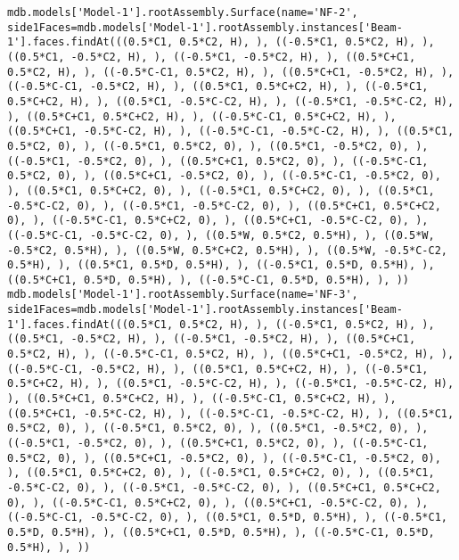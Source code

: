 \documentclass[12pt, letterpaper, oneside]{report}
\begin{document}
\begin{lstlisting}[frame=none]
mdb.models['Model-1'].rootAssembly.Surface(name='NF-2', side1Faces=mdb.models['Model-1'].rootAssembly.instances['Beam-1'].faces.findAt(((0.5*C1, 0.5*C2, H), ), ((-0.5*C1, 0.5*C2, H), ), ((0.5*C1, -0.5*C2, H), ), ((-0.5*C1, -0.5*C2, H), ), ((0.5*C+C1, 0.5*C2, H), ), ((-0.5*C-C1, 0.5*C2, H), ), ((0.5*C+C1, -0.5*C2, H), ), ((-0.5*C-C1, -0.5*C2, H), ), ((0.5*C1, 0.5*C+C2, H), ), ((-0.5*C1, 0.5*C+C2, H), ), ((0.5*C1, -0.5*C-C2, H), ), ((-0.5*C1, -0.5*C-C2, H), ), ((0.5*C+C1, 0.5*C+C2, H), ), ((-0.5*C-C1, 0.5*C+C2, H), ), ((0.5*C+C1, -0.5*C-C2, H), ), ((-0.5*C-C1, -0.5*C-C2, H), ), ((0.5*C1, 0.5*C2, 0), ), ((-0.5*C1, 0.5*C2, 0), ), ((0.5*C1, -0.5*C2, 0), ), ((-0.5*C1, -0.5*C2, 0), ), ((0.5*C+C1, 0.5*C2, 0), ), ((-0.5*C-C1, 0.5*C2, 0), ), ((0.5*C+C1, -0.5*C2, 0), ), ((-0.5*C-C1, -0.5*C2, 0), ), ((0.5*C1, 0.5*C+C2, 0), ), ((-0.5*C1, 0.5*C+C2, 0), ), ((0.5*C1, -0.5*C-C2, 0), ), ((-0.5*C1, -0.5*C-C2, 0), ), ((0.5*C+C1, 0.5*C+C2, 0), ), ((-0.5*C-C1, 0.5*C+C2, 0), ), ((0.5*C+C1, -0.5*C-C2, 0), ), ((-0.5*C-C1, -0.5*C-C2, 0), ), ((0.5*W, 0.5*C2, 0.5*H), ), ((0.5*W, -0.5*C2, 0.5*H), ), ((0.5*W, 0.5*C+C2, 0.5*H), ), ((0.5*W, -0.5*C-C2, 0.5*H), ), ((0.5*C1, 0.5*D, 0.5*H), ), ((-0.5*C1, 0.5*D, 0.5*H), ), ((0.5*C+C1, 0.5*D, 0.5*H), ), ((-0.5*C-C1, 0.5*D, 0.5*H), ), ))
mdb.models['Model-1'].rootAssembly.Surface(name='NF-3', side1Faces=mdb.models['Model-1'].rootAssembly.instances['Beam-1'].faces.findAt(((0.5*C1, 0.5*C2, H), ), ((-0.5*C1, 0.5*C2, H), ), ((0.5*C1, -0.5*C2, H), ), ((-0.5*C1, -0.5*C2, H), ), ((0.5*C+C1, 0.5*C2, H), ), ((-0.5*C-C1, 0.5*C2, H), ), ((0.5*C+C1, -0.5*C2, H), ), ((-0.5*C-C1, -0.5*C2, H), ), ((0.5*C1, 0.5*C+C2, H), ), ((-0.5*C1, 0.5*C+C2, H), ), ((0.5*C1, -0.5*C-C2, H), ), ((-0.5*C1, -0.5*C-C2, H), ), ((0.5*C+C1, 0.5*C+C2, H), ), ((-0.5*C-C1, 0.5*C+C2, H), ), ((0.5*C+C1, -0.5*C-C2, H), ), ((-0.5*C-C1, -0.5*C-C2, H), ), ((0.5*C1, 0.5*C2, 0), ), ((-0.5*C1, 0.5*C2, 0), ), ((0.5*C1, -0.5*C2, 0), ), ((-0.5*C1, -0.5*C2, 0), ), ((0.5*C+C1, 0.5*C2, 0), ), ((-0.5*C-C1, 0.5*C2, 0), ), ((0.5*C+C1, -0.5*C2, 0), ), ((-0.5*C-C1, -0.5*C2, 0), ), ((0.5*C1, 0.5*C+C2, 0), ), ((-0.5*C1, 0.5*C+C2, 0), ), ((0.5*C1, -0.5*C-C2, 0), ), ((-0.5*C1, -0.5*C-C2, 0), ), ((0.5*C+C1, 0.5*C+C2, 0), ), ((-0.5*C-C1, 0.5*C+C2, 0), ), ((0.5*C+C1, -0.5*C-C2, 0), ), ((-0.5*C-C1, -0.5*C-C2, 0), ), ((0.5*C1, 0.5*D, 0.5*H), ), ((-0.5*C1, 0.5*D, 0.5*H), ), ((0.5*C+C1, 0.5*D, 0.5*H), ), ((-0.5*C-C1, 0.5*D, 0.5*H), ), ))

\end{lstlisting}
\end{document}
